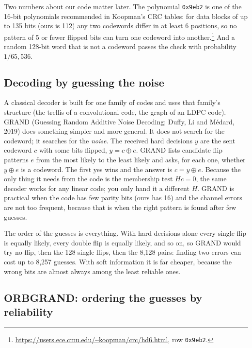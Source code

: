 \documentclass{article}
\begin{document}
Two numbers about our code matter later. The polynomial \texttt{0x9eb2} is one of the 16-bit
polynomials recommended in Koopman's CRC tables: for data blocks of up to 135 bits (ours is 112) any two
codewords differ in at least 6 positions, so no pattern of 5 or fewer flipped bits can turn one codeword
into another.\footnote{\url{https://users.ece.cmu.edu/~koopman/crc/hd6.html}, row \texttt{0x9eb2}.} And
a random 128-bit word that is not a codeword passes the check with probability $1/65{,}536$.

\subsection{Decoding by guessing the noise}

A classical decoder is built for one family of codes and uses that family's structure (the trellis of a
convolutional code, the graph of an LDPC code). GRAND (Guessing Random Additive Noise Decoding; Duffy,
Li and M\'edard, 2019) does something simpler and more general. It does not search for the codeword; it
searches for the \emph{noise}. The received hard decisions $y$ are the sent codeword $c$ with some bits
flipped, $y = c \oplus e$. GRAND lists candidate flip patterns $e$ from the most likely to the least
likely and asks, for each one, whether $y \oplus e$ is a codeword. The first yes wins and the answer is
$c = y \oplus e$. Because the only thing it needs from the code is the membership test $Hc=0$, the same
decoder works for any linear code; you only hand it a different $H$. GRAND is practical when the code has
few parity bits (ours has 16) and the channel errors are not too frequent, because that is when the right
pattern is found after few guesses.

The order of the guesses is everything. With hard decisions alone every single flip is equally likely,
every double flip is equally likely, and so on, so GRAND would try no flip, then the 128 single flips,
then the 8{,}128 pairs: finding two errors can cost up to 8{,}257 guesses. With soft information it is
far cheaper, because the wrong bits are almost always among the least reliable ones.

\subsection{ORBGRAND: ordering the guesses by reliability}
\end{document}
